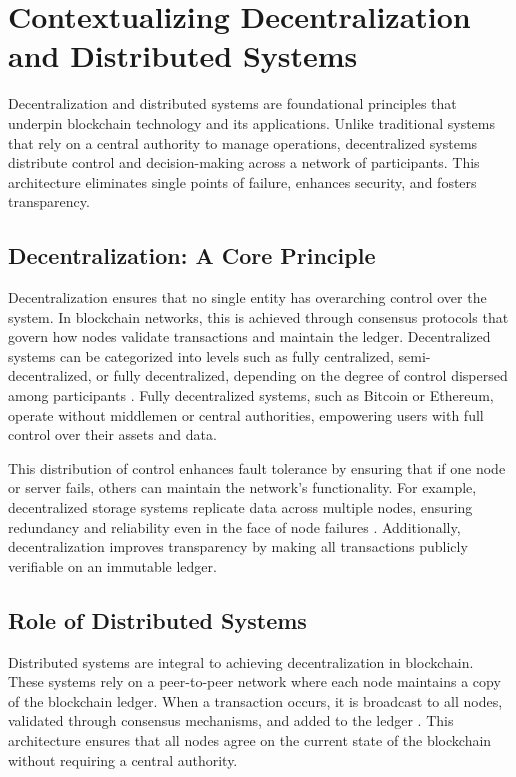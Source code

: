 \documentclass{article}
\begin{document}
\section*{Contextualizing Decentralization and Distributed Systems}

Decentralization and distributed systems are foundational principles that underpin blockchain technology and its applications. Unlike traditional systems that rely on a central authority to manage operations, decentralized systems distribute control and decision-making across a network of participants. This architecture eliminates single points of failure, enhances security, and fosters transparency.

\subsection*{Decentralization: A Core Principle}
Decentralization ensures that no single entity has overarching control over the system. In blockchain networks, this is achieved through consensus protocols that govern how nodes validate transactions and maintain the ledger. Decentralized systems can be categorized into levels such as fully centralized, semi-decentralized, or fully decentralized, depending on the degree of control dispersed among participants \cite{nakamoto2008bitcoin}. Fully decentralized systems, such as Bitcoin or Ethereum, operate without middlemen or central authorities, empowering users with full control over their assets and data.

This distribution of control enhances fault tolerance by ensuring that if one node or server fails, others can maintain the network's functionality. For example, decentralized storage systems replicate data across multiple nodes, ensuring redundancy and reliability even in the face of node failures \cite{decentralizedstorage2024}. Additionally, decentralization improves transparency by making all transactions publicly verifiable on an immutable ledger.

\subsection*{Role of Distributed Systems}
Distributed systems are integral to achieving decentralization in blockchain. These systems rely on a peer-to-peer network where each node maintains a copy of the blockchain ledger. When a transaction occurs, it is broadcast to all nodes, validated through consensus mechanisms, and added to the ledger \cite{lamport1982byzantine}. This architecture ensures that all nodes agree on the current state of the blockchain without requiring a central authority.
\end{document}
